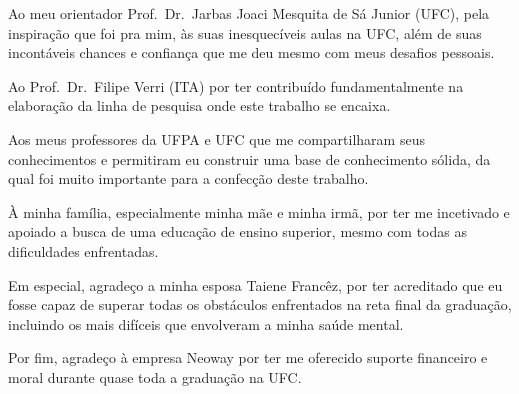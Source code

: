 Ao meu orientador Prof.\ Dr.\ Jarbas Joaci Mesquita de Sá Junior
(UFC), pela inspiração que foi pra mim, às suas inesquecíveis aulas na
UFC, além de suas incontáveis chances e confiança que me deu mesmo com
meus desafios pessoais.

Ao Prof.\ Dr.\ Filipe Verri (ITA) por ter contribuído fundamentalmente
na elaboração da linha de pesquisa onde este trabalho se encaixa.

Aos meus professores da UFPA e UFC que me compartilharam seus
conhecimentos e permitiram eu construir uma base de conhecimento
sólida, da qual foi muito importante para a confecção deste trabalho.

À minha família, especialmente minha mãe e minha irmã, por ter me
incetivado e apoiado a busca de uma educação de ensino superior, mesmo
com todas as dificuldades enfrentadas.

Em especial, agradeço a minha esposa Taiene Francêz, por ter
acreditado que eu fosse capaz de superar todas os obstáculos
enfrentados na reta final da graduação, incluindo os mais difíceis que
envolveram a minha saúde mental.

Por fim, agradeço à empresa Neoway por ter me oferecido suporte financeiro e moral
durante quase toda a graduação na UFC.\@
